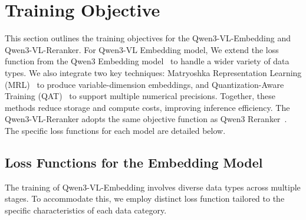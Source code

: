 \documentclass{article} %
\begin{document}
\section{Training Objective}

This section outlines the training objectives for the Qwen3-VL-Embedding and Qwen3-VL-Reranker.  
For Qwen3-VL Embedding model, We extend the loss function from the Qwen3 Embedding model~\citep{qwen3embedding} to handle a wider variety of data types. 
We also integrate two key techniques: Matryoshka Representation Learning (MRL)~\citep{kusupati2022matryoshka} to produce variable-dimension embeddings, and Quantization-Aware Training (QAT)~\citep{esser2020learned} to support multiple numerical precisions. Together, these methods reduce storage and compute costs, improving inference efficiency. The Qwen3-VL-Reranker adopts the same objective function as Qwen3 Reranker~\citep{qwen3embedding}. The specific loss functions for each model are detailed below.


\subsection{Loss Functions for the Embedding Model}
\label{sec:losses_embedding}

The training of Qwen3-VL-Embedding involves diverse data types across multiple stages. To accommodate this, we employ distinct loss function tailored to the specific characteristics of each data category.
\end{document}

